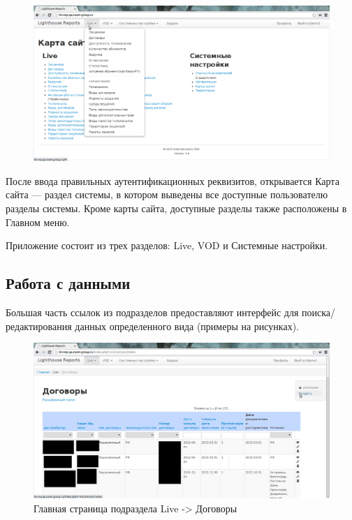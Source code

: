 \begin{figure}[!ht]
\begin{center}
\hspace*{-1cm} \includegraphics[scale=0.28, trim=0mm 0mm 0mm 10mm, clip]{../resources/screens/map.png}
\end{center}
\end{figure}

\vspace*{-1cm} 

После ввода правильных аутентификационных реквизитов, открывается Карта сайта --- раздел системы, в котором
выведены все доступные пользователю разделы системы. Кроме карты сайта, доступные разделы
также расположены в Главном меню.

Приложение состоит из трех разделов: Live, VOD и Системные настройки.

\subsection*{Работа с данными}

Большая часть ссылок из подразделов предоставляют интерфейс для поиска/редактирования данных
определенного вида (примеры на рисунках).

\begin{figure}[!ht]
\begin{center}
\hspace*{-1cm} \includegraphics[scale=0.35, trim=0mm 0mm 0mm 10mm, clip]{../resources/screens/contracts.png}
\caption{Главная страница подраздела Live -> Договоры}
\end{center}
\end{figure}

